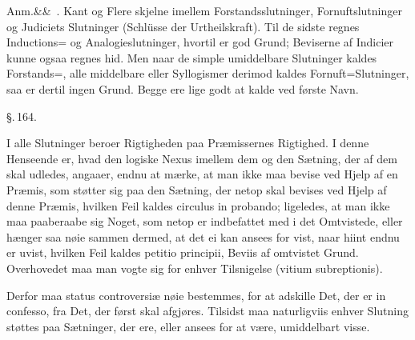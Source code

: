 \documentclass[12pt]{book}
\def\sperr#1{#1}%
\def\textit#1{#1}%
\newcommand{\sperr}[1]{\textls[180]{#1}}
\newcommand{\parag}[1]{%
  \par\vspace{0.9\baselineskip}%
  {\centering\textit{\S.\,#1.}\par}%
  \vspace{0.35\baselineskip}%
  \noindent\hspace{\parindent}\ignorespaces
}
\newcommand{\anm}[1]{%
  \par\vspace{0.5\baselineskip}%
  \noindent\hspace{\parindent}\sperr{Anm.}\ifx&#1&\else~\textit{#1}.\fi
  \enspace\ignorespaces
}
\newcommand{\opage}[1]{\marginnote{\footnotesize\textit{[#1]}}}
\begin{document}
\anm{} Kant og Flere skjelne imellem Forstandsslutninger, Fornuftslutninger og
Judiciets Slutninger (Schlüsse der Urtheilskraft). Til de sidste regnes
Inductions= og Analogieslutninger, hvortil er god Grund; Beviserne af Indicier
kunne ogsaa regnes hid. Men naar de simple umiddelbare Slutninger kaldes
Forstands=, alle middelbare eller Syllogismer derimod kaldes Fornuft=Slutninger,
saa er dertil ingen Grund. Begge ere lige godt at kalde ved første Navn.

\parag{164}

I alle Slutninger beroer Rigtigheden paa Præmissernes Rigtighed. I denne
Henseende er, hvad den logiske Nexus imellem dem og den Sætning, der af dem skal
udledes, angaaer, endnu at mærke, at man ikke maa bevise ved Hjelp af en Præmis,
som støtter sig paa den Sætning, der netop skal bevises ved Hjelp af denne
Præmis, hvilken Feil kaldes \textit{circulus in probando}; ligeledes, at man
ikke maa paaberaabe sig Noget, som netop er indbefattet med i det Omtvistede,
eller hænger saa nøie sammen dermed, at det ei
\opage{361} kan ansees for vist, naar hiint endnu er uvist, hvilken Feil kaldes
\textit{petitio principii}, Beviis af omtvistet Grund. Overhovedet maa man vogte
sig for enhver Tilsnigelse (\textit{vitium subreptionis}).

Derfor maa \textit{status controversiæ} nøie bestemmes, for at adskille Det, der
er \textit{in confesso}, fra Det, der først skal afgjøres. Tilsidst maa
naturligviis enhver Slutning støttes paa Sætninger, der ere, eller ansees for at
være, umiddelbart visse.
\end{document}
